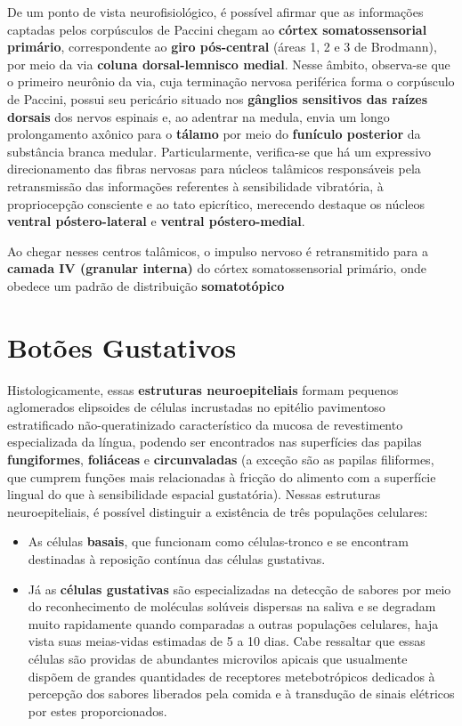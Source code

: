 \documentclass[
]{book}
\begin{document}
De um ponto de vista neurofisiológico, é possível afirmar que as informações captadas pelos corpúsculos de Paccini chegam ao \textbf{córtex somatossensorial primário}, correspondente ao \textbf{giro pós-central} (áreas 1, 2 e 3 de Brodmann), por meio da via \textbf{coluna dorsal-lemnisco medial}. Nesse âmbito, observa-se que o primeiro neurônio da via, cuja terminação nervosa periférica forma o corpúsculo de Paccini, possui seu pericário situado nos \textbf{gânglios sensitivos das raízes dorsais} dos nervos espinais e, ao adentrar na medula, envia um longo prolongamento axônico para o \textbf{tálamo} por meio do \textbf{funículo posterior} da substância branca medular. Particularmente, verifica-se que há um expressivo direcionamento das fibras nervosas para núcleos talâmicos responsáveis pela retransmissão das informações referentes à sensibilidade vibratória, à propriocepção consciente e ao tato epicrítico, merecendo destaque os núcleos \textbf{ventral póstero-lateral} e \textbf{ventral póstero-medial}.

Ao chegar nesses centros talâmicos, o impulso nervoso é retransmitido para a \textbf{camada IV (granular interna)} do córtex somatossensorial primário, onde obedece um padrão de distribuição \textbf{somatotópico}

\hypertarget{botuxf5es-gustativos}{%
\chapter{Botões Gustativos}\label{botuxf5es-gustativos}}

Histologicamente, essas \textbf{estruturas neuroepiteliais} formam pequenos aglomerados elipsoides de células incrustadas no epitélio pavimentoso estratificado não-queratinizado característico da mucosa de revestimento especializada da língua, podendo ser encontrados nas superfícies das papilas \textbf{fungiformes}, \textbf{foliáceas} e \textbf{circunvaladas} (a exceção são as papilas filiformes, que cumprem funções mais relacionadas à fricção do alimento com a superfície lingual do que à sensibilidade espacial gustatória). Nessas estruturas neuroepiteliais, é possível distinguir a existência de três populações celulares:

\begin{itemize}
\item
  As células \textbf{basais}, que funcionam como células-tronco e se encontram destinadas à reposição contínua das células gustativas.
\item
  Já as \textbf{células gustativas} são especializadas na detecção de sabores por meio do reconhecimento de moléculas solúveis dispersas na saliva e se degradam muito rapidamente quando comparadas a outras populações celulares, haja vista suas meias-vidas estimadas de 5 a 10 dias. Cabe ressaltar que essas células são providas de abundantes microvilos apicais que usualmente dispõem de grandes quantidades de receptores metebotrópicos dedicados à percepção dos sabores liberados pela comida e à transdução de sinais elétricos por estes proporcionados.
\end{itemize}
\end{document}
